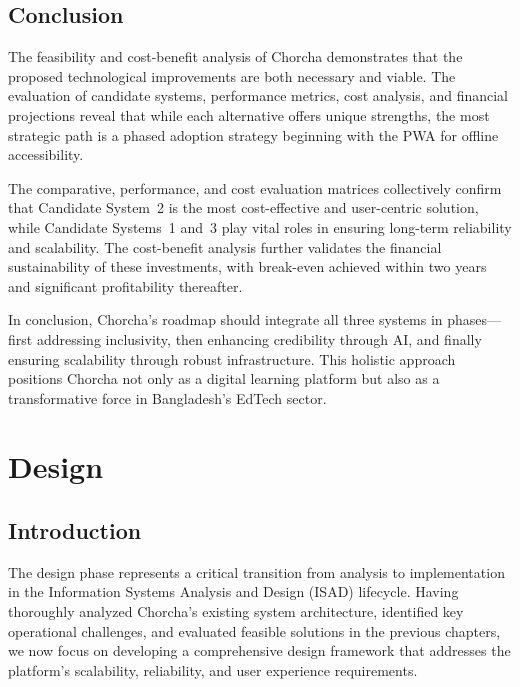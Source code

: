 \documentclass[12pt,a4paper,oneside]{book}
\begin{document}
\section{Conclusion}

The feasibility and cost-benefit analysis of Chorcha demonstrates that the proposed technological improvements are both necessary and viable. The evaluation of candidate systems, performance metrics, cost analysis, and financial projections reveal that while each alternative offers unique strengths, the most strategic path is a phased adoption strategy beginning with the PWA for offline accessibility.

The comparative, performance, and cost evaluation matrices collectively confirm that Candidate System~2 is the most cost-effective and user-centric solution, while Candidate Systems~1 and~3 play vital roles in ensuring long-term reliability and scalability. The cost-benefit analysis further validates the financial sustainability of these investments, with break-even achieved within two years and significant profitability thereafter.

In conclusion, Chorcha’s roadmap should integrate all three systems in phases---first addressing inclusivity, then enhancing credibility through AI, and finally ensuring scalability through robust infrastructure. This holistic approach positions Chorcha not only as a digital learning platform but also as a transformative force in Bangladesh’s EdTech sector.


\newpage

\chapter{Design}
\thispagestyle{empty}

\section{Introduction}

The design phase represents a critical transition from analysis to implementation in the Information Systems Analysis and Design (ISAD) lifecycle. Having thoroughly analyzed Chorcha's existing system architecture, identified key operational challenges, and evaluated feasible solutions in the previous chapters, we now focus on developing a comprehensive design framework that addresses the platform's scalability, reliability, and user experience requirements.
\end{document}
